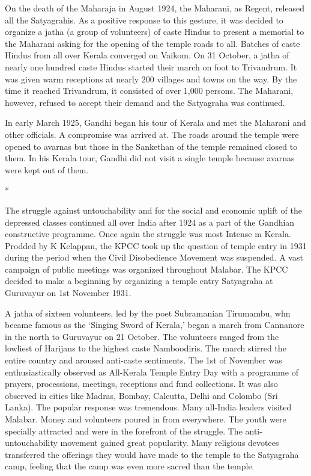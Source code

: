 On the death of the Maharaja in August 1924, the Maharani, as Regent, released all the Satyagrahis. As a positive response to this gesture, it was decided to organize a jatha (a group of volunteers) of caste Hindus to present a memorial to the Maharani asking for the opening of the temple roads to all. Batches of caste Hindus from all over Kerala converged on Vaikom. On 31 October, a jatha of nearly one hundred caste Hindus started their march on foot to Trivandrum. It was given warm receptions at nearly 200 villages and towns on the way. By the time it reached Trivandrum, it consisted of over 1,000 persons. The Maharani, however, refused to accept their demand and the Satyagraha was continued.

In early March 1925, Gandhi began his tour of Kerala and met the Maharani and other officials. A compromise was arrived at. The roads around the temple were opened to avarnas but those in the Sankethan of the temple remained closed to them. In his Kerala tour, Gandhi did not visit a single temple because avarnas were kept out of them.

\begin{center}*\end{center}



The struggle against untouchability and for the social and economic uplift of the depressed classes continued all over India after 1924 as a part of the Gandhian constructive programme. Once again the struggle was most Intense m Kerala. Prodded by K Kelappan, the KPCC took up the question of temple entry in 1931 during the period when the Civil Disobedience Movement was suspended. A vast campaign of public meetings was organized throughout Malabar. The KPCC decided to make a beginning by organizing a temple entry Satyagraha at Guruvayur on 1st November 1931.

A jatha of sixteen volunteers, led by the poet Subramanian Tirumambu, whn became famous as the ‘Singing Sword of Kerala,’ began a march from Cannanore in the north to Guruvayur on 21 October. The volunteers ranged from the lowliest of Harijans to the highest caste Namboodiris. The march stirred the entire country and aroused anti-caste sentiments. The 1st of November was enthusiastically observed as All-Kerala Temple Entry Day with a programme of prayers, processions, meetings, receptions and fund collections. It was also observed in cities like Madras, Bombay, Calcutta, Delhi and Colombo (Sri Lanka). The popular response was tremendous. Many all-India leaders visited Malabar. Money and volunteers poured in from everywhere. The youth were specially attracted and were in the forefront of the struggle. The anti-untouchability movement gained great popularity. Many religious devotees transferred the offerings they would have made to the temple to the Satyagraha camp, feeling that the camp was even more sacred than the temple.

